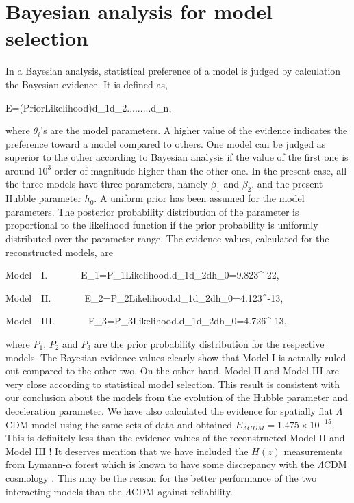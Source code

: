 \documentclass[11pt]{article}
\begin{document}
\section{Bayesian analysis for model selection}
\label{bayev}

In a Bayesian analysis, statistical preference of a model is judged by calculation the Bayesian evidence. It is defined as,

\be
E=\int (Prior\times Likelihood)d\theta_1d\theta_2.........d\theta_n,
\ee

where $\theta_i$'s are the model parameters. A higher value of the evidence indicates the preference toward a model compared to others. One model can be judged as superior to the other according to Bayesian analysis if the value of the first one is around $10^3$ order of magnitude higher than the other one. In the present case, all the three models have three parameters, namely $\beta_1$ and $\beta_2$, and the present Hubble parameter $h_0$. A uniform prior has been assumed for the model parameters. The posterior probability distribution of the parameter is proportional to the likelihood function if the prior probability is uniformly distributed over the parameter range. The evidence values, calculated for the reconstructed models, are

\be
Model~~I.~~~~~~~E_1=P_1\int Likelihood.d\beta_1d\beta_2dh_0=9.823^{-22},
\ee 

\be
Model~~II.~~~~~~~E_2=P_2\int Likelihood.d\beta_1d\beta_2dh_0=4.123^{-13},
\ee 

\be
Model~~III.~~~~~~~E_3=P_3\int Likelihood.d\beta_1d\beta_2dh_0=4.726^{-13},
\ee

where $P_1$, $P_2$ and $P_3$ are the prior probability distribution for the respective models. The Bayesian evidence values clearly show that Model I is actually ruled out compared to the other two. On the other hand, Model II and Model III are very close according to statistical model selection. This result is consistent with our conclusion about the models from the evolution of the Hubble parameter and deceleration parameter. We have also calculated the evidence for spatially flat $\Lambda$CDM model using the same sets of data and obtained $E_{\Lambda CDM}=1.475\times 10^{-15}$. This is definitely less than the evidence values of the reconstructed Model II and Model III ! It deserves mention that we have included the $H(z)$ measurements from Lymann-$\alpha$ forest which is known to have some discrepancy with the $\Lambda$CDM cosmology \cite{Ade:2015xua}. This may be the reason for the better performance of the two interacting models than the $\Lambda$CDM against reliability.
\end{document}
